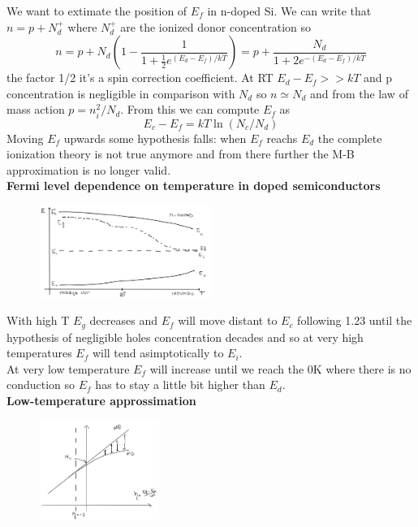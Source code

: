We want to extimate the position of $E_f$ in n-doped Si. We can write that $n=p+N_d^+$ where $N_d^+$ are the ionized donor concentration so
\begin{equation}
n=p+N_d(1-\frac{1}{1+\frac{1}{2} e^{(E_d-E_f)/kT}})=p+\frac{N_d}{1+2e^{-(E_d-E_f)/kT}}
\end{equation}
the factor 1/2 it's a spin correction coefficient. At RT $E_d-E_f>>kT$ and p concentration is negligible in comparison with $N_d$ so $n\simeq N_d$ and from the law of mass action $p=n_i^2/N_d$. From this we can compute $E_f$ as 
\begin{equation}
E_c-E_f=kT\ln (N_c/N_d)
\end{equation}
Moving $E_f$ upwards some hypothesis falls: when $E_f$ reachs $E_d$ the complete ionization theory is not true anymore and from there further the M-B approximation is no longer valid.\\
\newline
{\bf Fermi level dependence on temperature in doped semiconductors}\\ 

\begin{figure}
\includegraphics[width=0.5\textwidth]{E_f(T).png}
\end{figure}

With high T $E_g$ decreases and $E_f$ will move distant to $E_c$ following 1.23 until the hypothesis of negligible holes concentration decades and so at very high temperatures $E_f$ will tend asimptotically to $E_i$.\\
At very low temperature $E_f$ will increase until we reach the 0K where there is no conduction so $E_f$ has to stay a little bit higher than $E_d$.\\


{\bf Low-temperature approssimation}\\

\begin{figure}
\includegraphics[width=0.35\textwidth]{mbfd.png}
\end{figure}

